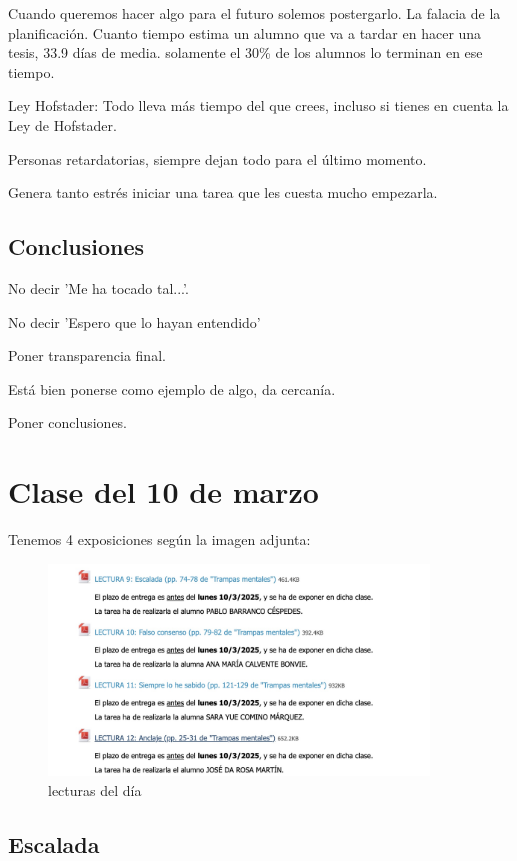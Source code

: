 \documentclass[12pt, a4paper, twoside]{article}
\begin{document}
Cuando queremos hacer algo para el futuro solemos postergarlo. La falacia de la planificación. 
Cuanto tiempo estima un alumno que va a tardar en hacer una tesis, 33.9 días de media. solamente el 30\%
de los alumnos lo terminan en ese tiempo.

Ley Hofstader: Todo lleva más tiempo del que crees, incluso si tienes en cuenta la Ley de Hofstader.

Personas retardatorias, siempre dejan todo para el último momento.

Genera tanto estrés iniciar una tarea que les cuesta mucho empezarla.

\subsection{Conclusiones}

No decir 'Me ha tocado tal...'.


No decir 'Espero que lo hayan entendido'

Poner transparencia final.

Está bien ponerse como ejemplo de algo, da cercanía.

Poner conclusiones.

\newpage

\section{Clase del 10 de marzo}

Tenemos 4 exposiciones según la imagen adjunta:

\begin{figure}[h]
    \centering
    \includegraphics[width=0.9\textwidth]{./Images/0310.jpg}
    \caption{lecturas del día}
\end{figure}

\subsection{Escalada}
\end{document}

